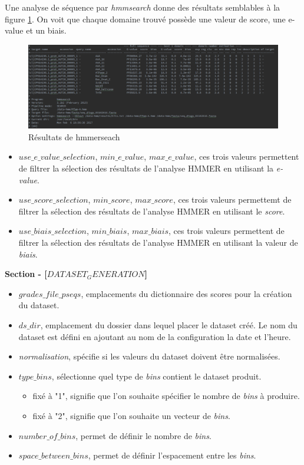 \newpage
Une analyse de séquence par \emph{hmmsearch} donne des résultats semblables à la figure \ref{fig:hmmseach}. On voit que chaque domaine trouvé possède une valeur de score, une e-value et un biais.

\begin{figure}[H] 
\centering 
\includegraphics[width=1\columnwidth]{img/hmmsearchresult} 
\caption[hmmseach]{Résultats de hmmerseach}
\label{fig:hmmseach} 
\end{figure}

\begin{itemize}
\item \emph{$use\_e\_value\_selection$}, \emph{$min\_e\_value$}, \emph{$max\_e\_value$}, ces trois valeurs permettent de filtrer la sélection des résultats de l'analyse HMMER en utilisant la \emph{e-value}.
\item \emph{$use\_score\_selection$}, \emph{$min\_score$}, \emph{$max\_score$}, ces trois valeurs permettemt de filtrer la sélection des résultats de l'analyse HMMER en utilisant le \emph{score}.
\item \emph{$use\_biais\_selection$}, \emph{$min\_biais$}, \emph{$max\_biais$}, ces trois valeurs permettent de filtrer la sélection des résultats de l'analyse HMMER en utilisant la valeur de  \emph{biais}.
\end{itemize}

\textbf{Section - [$DATASET_GENERATION$]}

\begin{itemize}
\item \emph{$grades\_file\_pseqs$}, emplacements du dictionnaire des scores pour la création du dataset.
\item \emph{$ds\_dir$}, emplacement du dossier dans lequel placer le dataset créé. Le nom du dataset est défini en ajoutant au nom de la configuration la date et l'heure.
\item \emph{normalisation}, spécifie si les valeurs du dataset doivent être normalisées.
\item \emph{$type\_bins$}, sélectionne quel type de \emph{bins} contient le dataset produit.
\begin{itemize}
\item fixé à "1", signifie que l'on souhaite spécifier le nombre de \emph{bins} à produire.
\item fixé à "2", signifie que l'on souhaite un vecteur de \emph{bins}.
\end{itemize}
\item \emph{$number\_of\_bins$}, permet de définir le nombre de \emph{bins}.
\item \emph{$space\_between\_bins$}, permet de définir l'espacement entre les \emph{bins}.
\end{itemize}


